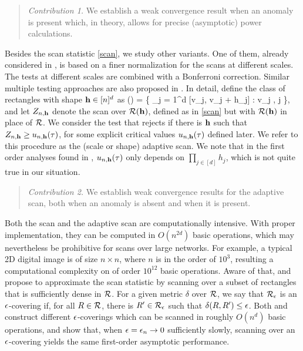 \documentclass[twoside,11pt]{article}
\begin{document}
\begin{quote}
{\em Contribution 1.}  We establish a weak convergence result when an anomaly is present  which, in theory, allows for precise (asymptotic) power calculations.
\end{quote}

Besides the scan statistic \eqref{scan}, we study other variants.  One of them, already considered in \citep{cluster,MR2604703}, is based on a finer normalization for the scans at different scales.  
The tests at different scales are combined with a Bonferroni correction.  Similar multiple testing approaches are also proposed in \citep{glaz2004multiple,wang2014variable}.
In detail, define the class of rectangles with shape $\mathbf{h} \in [n]^d$ as 
\beq \label{Rh}
\Rcal(\hb) = \left\{ \times_{j = 1}^d [v_j, v_j + h_j] : v_j \in [n-h_j], \forall j \in [d] \right\},
\eeq
and let $Z_{n,\mathbf{h}}$ denote the scan over $\mathcal{R}(\mathbf{h})$, defined as in \eqref{scan} but with $\mathcal{R}(\mathbf{h})$ in place of $\mathcal{R}$.
We consider the test that rejects if there is $\mathbf{h}$ such that $Z_{n,\mathbf{h}} \ge u_{n,\mathbf{h}}(\tau)$, for some explicit critical values $u_{n,\mathbf{h}}(\tau)$ defined later. 
We refer to this procedure as the (scale or shape) adaptive scan.
We note that in the first order analyses found in \citep{cluster,MR2604703}, $u_{n,\mathbf{h}}(\tau)$ only depends on $\prod_{j \in [d]} h_j$, which is not quite true in our situation.

\begin{quote}
{\em Contribution 2.}  We establish weak convergence results for the adaptive scan, both when an anomaly is absent and when it is present. 
\end{quote}

Both the scan and the adaptive scan are computationally intensive.  With proper implementation, they can be computed in $O(n^{2d})$ basic operations, which may nevertheless be prohibitive for scans over large networks.  
For example, a typical 2D digital image is  of size $n \times n$, where $n$ is in the order of $10^3$, resulting a computational complexity on of order $10^{12}$ basic operations.
Aware of that, \cite{MGD,cluster} and \cite{MR2604703} propose to approximate the scan statistic by scanning over a subset of rectangles that is sufficiently dense in $\mathcal{R}$.
For a given metric $\delta$ over $\mathcal{R}$, we say that $\mathcal{R}_\epsilon$ is an $\epsilon$-covering if, for all $R \in \mathcal{R}$, there is $R' \in \mathcal{R}_\epsilon$ such that $\delta(R, R') \le \epsilon$.  
Both \cite{MGD,cluster} and \cite{MR2604703} construct different $\epsilon$-coverings which can be scanned in roughly $O(n^d)$ basic operations, and show that, when $\epsilon = \epsilon_n \to 0$ sufficiently slowly, scanning over an $\epsilon$-covering yields the same first-order asymptotic performance.  
\end{document}
